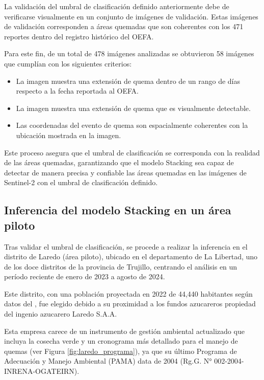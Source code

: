 La validación del umbral de clasificación definido anteriormente debe de verificarse visualmente en un conjunto de imágenes de validación.
Estas imágenes de validación corresponden a áreas quemadas que son coherentes con los 471 reportes dentro del registro histórico del OEFA.

Para este fin, de un total de 478 imágenes analizadas se obtuvieron 58 imágenes que cumplían con los siguientes criterios:
\begin{itemize} 
    \item La imagen muestra una extensión de quema dentro de un rango de  días respecto a la fecha reportada al OEFA. 
    \item La imagen muestra una extensión de quema que es visualmente detectable. 
    \item Las coordenadas del evento de quema son espacialmente coherentes con la ubicación mostrada en la imagen. 
\end{itemize}

Este proceso asegura que el umbral de clasificación se corresponda con la realidad de las áreas quemadas, garantizando que el modelo Stacking sea capaz de detectar de manera precisa y confiable las áreas 
quemadas en las imágenes de Sentinel-2 con el umbral de clasificación definido.

\subsection{Inferencia del modelo Stacking en un área piloto}
\label{sec:inferencia}
Tras validar el umbral de clasificación, se procede a realizar la inferencia en el distrito de Laredo (área piloto), ubicado en el departamento de La Libertad, uno de los doce distritos de la provincia de Trujillo, centrando el análisis en un período reciente 
de enero de 2023 a agosto de 2024. 

Este distrito, con una población proyectada en 2022 de 44,440 habitantes según datos del 
\citet{inei_peru_2022}, fue elegido debido a su proximidad a los fundos azucareros propiedad del ingenio azucarero Laredo S.A.A. 

Esta empresa carece de un instrumento de gestión ambiental actualizado que incluya la cosecha verde y un cronograma más detallado 
para el manejo de quemas (ver Figura \ref{fig:laredo_programa}), ya que su último Programa de Adecuación y Manejo Ambiental (PAMA) data de 2004 (Rg.G. N° 002-2004-INRENA-OGATEIRN).


